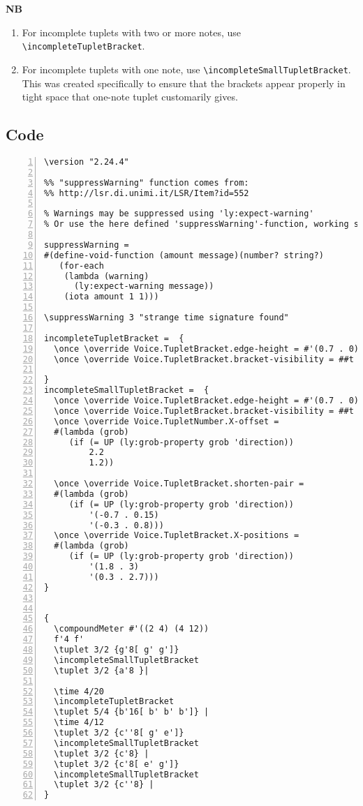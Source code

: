 \textbf{NB} 
\begin{enumerate}
\item For incomplete tuplets with two or more notes, use \verb|\incompleteTupletBracket|. 
\item For incomplete tuplets with one note, use \verb|\incompleteSmallTupletBracket|. This was created specifically to ensure that the brackets appear properly in tight space that one-note tuplet customarily gives.
\end{enumerate}

\subsection{Code}
\begin{Verbatim}[numbers=left,xleftmargin=5mm]
\version "2.24.4"

%% "suppressWarning" function comes from:
%% http://lsr.di.unimi.it/LSR/Item?id=552

% Warnings may be suppressed using 'ly:expect-warning'
% Or use the here defined 'suppressWarning'-function, working since 2.20.

suppressWarning =
#(define-void-function (amount message)(number? string?)
   (for-each
    (lambda (warning)
      (ly:expect-warning message))
    (iota amount 1 1)))

\suppressWarning 3 "strange time signature found"

incompleteTupletBracket =  {
  \once \override Voice.TupletBracket.edge-height = #'(0.7 . 0)
  \once \override Voice.TupletBracket.bracket-visibility = ##t

}
incompleteSmallTupletBracket =  {
  \once \override Voice.TupletBracket.edge-height = #'(0.7 . 0)
  \once \override Voice.TupletBracket.bracket-visibility = ##t
  \once \override Voice.TupletNumber.X-offset =
  #(lambda (grob)
     (if (= UP (ly:grob-property grob 'direction))
         2.2
         1.2))

  \once \override Voice.TupletBracket.shorten-pair =
  #(lambda (grob)
     (if (= UP (ly:grob-property grob 'direction))
         '(-0.7 . 0.15)
         '(-0.3 . 0.8)))
  \once \override Voice.TupletBracket.X-positions =
  #(lambda (grob)
     (if (= UP (ly:grob-property grob 'direction))
         '(1.8 . 3)
         '(0.3 . 2.7)))
}


{
  \compoundMeter #'((2 4) (4 12))
  f'4 f'
  \tuplet 3/2 {g'8[ g' g']}
  \incompleteSmallTupletBracket
  \tuplet 3/2 {a'8 }|

  \time 4/20
  \incompleteTupletBracket
  \tuplet 5/4 {b'16[ b' b' b']} |
  \time 4/12
  \tuplet 3/2 {c''8[ g' e']}
  \incompleteSmallTupletBracket
  \tuplet 3/2 {c'8} |
  \tuplet 3/2 {c'8[ e' g']}
  \incompleteSmallTupletBracket
  \tuplet 3/2 {c''8} |
}
\end{Verbatim}
